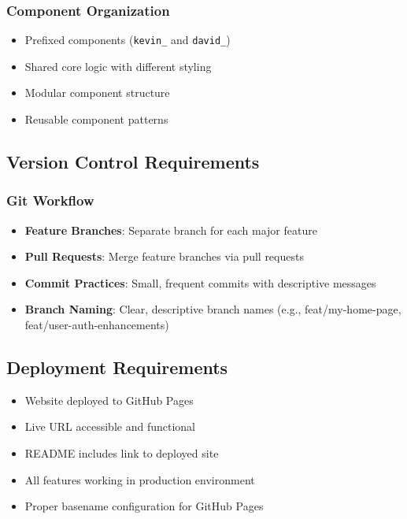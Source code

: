 \documentclass[11pt,a4paper]{article}
\begin{document}
\subsubsection{Component Organization}
\begin{itemize}[leftmargin=*]
    \item Prefixed components (\texttt{kevin\_} and \texttt{david\_})
    \item Shared core logic with different styling
    \item Modular component structure
    \item Reusable component patterns
\end{itemize}

\subsection{Version Control Requirements}

\subsubsection{Git Workflow}
\begin{itemize}[leftmargin=*]
    \item \textbf{Feature Branches}: Separate branch for each major feature
    \item \textbf{Pull Requests}: Merge feature branches via pull requests
    \item \textbf{Commit Practices}: Small, frequent commits with descriptive messages
    \item \textbf{Branch Naming}: Clear, descriptive branch names (e.g., feat/my-home-page, feat/user-auth-enhancements)
\end{itemize}

\subsection{Deployment Requirements}

\begin{itemize}[leftmargin=*]
    \item Website deployed to GitHub Pages
    \item Live URL accessible and functional
    \item README includes link to deployed site
    \item All features working in production environment
    \item Proper basename configuration for GitHub Pages
\end{itemize}
\end{document}
